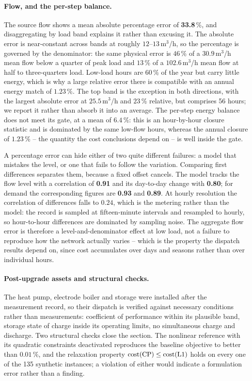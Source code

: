 \paragraph{Flow, and the per-step balance.}
The source flow shows a mean absolute percentage error of \textbf{33.8}\,\%, and
disaggregating by load band explains it rather than excusing it. The absolute error is
near-constant across bands at roughly $12$--$13$\,m$^3$/h, so the percentage is governed by
the denominator: the same physical error is $46$\,\% of a $30.9$\,m$^3$/h mean flow below a
quarter of peak load and $13$\,\% of a $102.6$\,m$^3$/h mean flow at half to three-quarters
load. Low-load hours are $60$\,\% of the year but carry little energy, which is why a large
relative error there is compatible with an annual energy match of $1.23$\,\%. The top band
is the exception in both directions, with the largest absolute error at $25.5$\,m$^3$/h and
$23$\,\% relative, but comprises 56 hours; we report it rather than absorb it into an
average. The per-step energy balance does not meet its gate, at a mean of $6.4$\,\%: this is
an hour-by-hour closure statistic and is dominated by the same low-flow hours, whereas the
annual closure of $1.23$\,\% -- the quantity the cost conclusions depend on -- is well
inside the gate.

A percentage error can hide either of two quite different failures: a model that mistakes
the level, or one that fails to follow the variation. Comparing first differences separates
them, because a fixed offset cancels. The model tracks the flow level with a correlation of
\textbf{0.91} and its day-to-day change with \textbf{0.80}; for demand the corresponding
figures are \textbf{0.93} and \textbf{0.89}. At hourly resolution the correlation of
differences falls to $0.24$, which is the metering rather than the model: the record is
sampled at fifteen-minute intervals and resampled to hourly, so hour-to-hour differences are
dominated by sampling noise. The aggregate flow error is therefore a level-and-denominator
effect at low load, not a failure to reproduce how the network actually varies -- which is
the property the dispatch results depend on, since cost accumulates over days and seasons
rather than over individual hours.

\paragraph{Post-upgrade assets and structural checks.}
The heat pump, electrode boiler and storage were installed after the measurement record, so
their dispatch is verified against necessary conditions rather than measurements:
coefficient of performance within its plausible band, storage state of charge inside its
operating limits, no simultaneous charge and discharge. Two structural checks close the
section. The nonlinear reference with its quadratic constraints deactivated reproduces the
baseline objective to better than $0.01$\,\%, and the relaxation property
$\mathrm{cost}(\mathrm{CP}) \le \mathrm{cost}(\mathrm{L1})$ holds on every one of the 135 synthetic
instances; a violation of either would indicate a formulation error rather than a finding.
